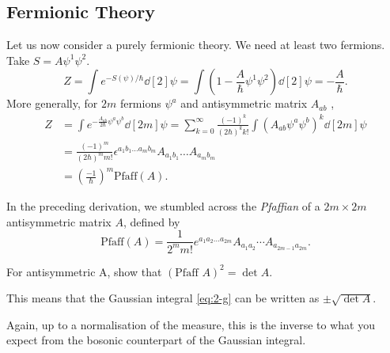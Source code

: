 \subsection{Fermionic Theory}%
\label{sub:fermionic_theory}

Let us now consider a purely fermionic theory. We need at least two fermions.
Take $S = A \psi^1 \psi^2$.
\begin{equation}
  Z = \int e^{-S (\psi) / \hbar} \dd[2]{\psi} = \int \left( 1 - \frac{A}{\hbar} \psi^1 \psi^2 \right) \dd[2]{\psi} = - \frac{A}{\hbar}.
\end{equation}
More generally, for $2m$  fermions $\psi^{a}$  and antisymmetric matrix $A_{ab}$ ,
\begin{align}
  Z &= \int e^{-\frac{A_{ab}}{2 \hbar} \psi^a \psi^{b}} \dd[2m]{\psi} = \sum_{k = 0}^{\infty} \frac{(-1)^k}{(2 \hbar)^k k!} \int (A_{ab} \psi^{a} \psi^{b})^k \dd[2m]{\psi}  \\
    &= \frac{(-1)^m}{(2 \hbar)^{m} m!} \epsilon^{a_1 b_1 \dots a_m b_m} A_{a_1 b_1 } \dots A_{a_m b_m} \\
    &= \left( \frac{-1}{\hbar} \right)^m \text{Pfaff}(A).
    \label{eq:2-g}
\end{align}
\begin{definition}[Pfaffian]
  In the preceding derivation, we stumbled across the \emph{Pfaffian} of a $2m \times 2m$ antisymmetric matrix $A$, defined by
  \begin{equation}
    \text{Pfaff}(A) = \frac{1}{2^m m!} e^{a_1 a_2 \dots a_{2m}} A_{a_1 a_2} \cdots A_{a_{2m-1} a_{2m}}.
  \end{equation}
\end{definition}
\begin{exercise}
  For antisymmetric A, show that $(\text{Pfaff } A)^2 = \det A$.
\end{exercise}
This means that the Gaussian integral \eqref{eq:2-g} can be written as $\pm \sqrt{\det A}$.
\begin{leftbar}
  \begin{remark}
    Again, up to a normalisation of the measure, this is the inverse to what you expect from the bosonic counterpart of the Gaussian integral.
  \end{remark}
\end{leftbar}
